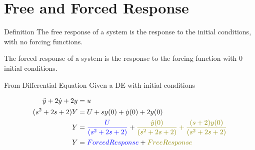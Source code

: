 \documentclass{../templates/topic}
\begin{document}
\chapter{Free and Forced Response}

\begin{section}{Definition}
	 The free response of a system is the response to the initial conditions, with no forcing functions.
	
	 The forced response of a system is the response to the forcing function with 0 initial conditions.
	
\end{section}

\begin{section}{From Differential Equation}
	Given a DE with initial conditions
	
	\begin{align}
		\ddot{y}+2\dot{y}+2y&=u\\
		(s^2+2s+2)Y&=U+sy(0)+\dot{y}(0)+2y(0)\\
		Y&=\textcolor{blue}{\frac{U}{(s^2+2s+2)}}+\textcolor{olive}{\frac{\dot{y}(0)}{(s^2+2s+2)}+\frac{(s+2)y(0)}{(s^2+2s+2)}}\\
		Y&=\textcolor{blue}{Forced Response}+\textcolor{olive}{Free Response}
	\end{align}
	
\end{section}
\end{document}
